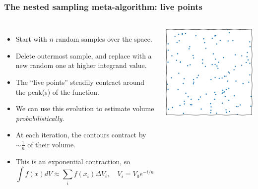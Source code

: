 \documentclass[aspectratio=169]{beamer}
\begin{document}
\begin{frame}
\begin{columns}
    \end{columns}
\end{frame}

\begin{frame}
    \frametitle{The nested sampling meta-algorithm: live points}
    \begin{columns}
        \begin{itemize}
            \item Start with $n$ random samples over the space.
            \item Delete outermost sample, and replace with a new random one at higher integrand value.
            \item The ``live points'' steadily contract around the peak(s) of the function.
            \item We can use this evolution to estimate volume \emph{probabilistically}.
            \item At each iteration, the contours contract by $\sim\frac{1}{n}$ of their volume.
            \item This is an exponential contraction, so
                \[  \int f(x) dV \approx \sum_i f(x_i) \Delta V_i, \quad V_i = V_0 e^{-i/n} \]
        \end{itemize}
        \includegraphics[width=\textwidth,page=4]{figures/himmelblau}
    \end{columns}
\end{frame}
\end{document}
